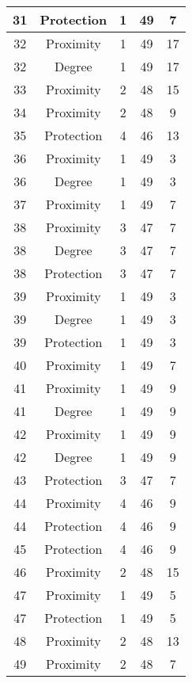 \documentclass[results.tex]{subfiles}
\begin{document}
\begin{center}
\begin{tabular}{| c || c | c | c | c |}
    31 & Protection & 1 & 49 & 7 \\ 
    \hline
    32 & Proximity & 1 & 49 & 17 \\ 
    \hline
    32 & Degree & 1 & 49 & 17 \\ 
    \hline
    33 & Proximity & 2 & 48 & 15 \\ 
    \hline
    34 & Proximity & 2 & 48 & 9 \\ 
    \hline
    35 & Protection & 4 & 46 & 13 \\ 
    \hline
    36 & Proximity & 1 & 49 & 3 \\ 
    \hline
    36 & Degree & 1 & 49 & 3 \\ 
    \hline
    37 & Proximity & 1 & 49 & 7 \\ 
    \hline
    38 & Proximity & 3 & 47 & 7 \\ 
    \hline
    38 & Degree & 3 & 47 & 7 \\ 
    \hline
    38 & Protection & 3 & 47 & 7 \\ 
    \hline
    39 & Proximity & 1 & 49 & 3 \\ 
    \hline
    39 & Degree & 1 & 49 & 3 \\ 
    \hline
    39 & Protection & 1 & 49 & 3 \\ 
    \hline
    40 & Proximity & 1 & 49 & 7 \\ 
    \hline
    41 & Proximity & 1 & 49 & 9 \\ 
    \hline
    41 & Degree & 1 & 49 & 9 \\ 
    \hline
    42 & Proximity & 1 & 49 & 9 \\ 
    \hline
    42 & Degree & 1 & 49 & 9 \\ 
    \hline
    43 & Protection & 3 & 47 & 7 \\ 
    \hline
    44 & Proximity & 4 & 46 & 9 \\ 
    \hline
    44 & Protection & 4 & 46 & 9 \\ 
    \hline
    45 & Protection & 4 & 46 & 9 \\ 
    \hline
    46 & Proximity & 2 & 48 & 15 \\ 
    \hline
    47 & Proximity & 1 & 49 & 5 \\ 
    \hline
    47 & Protection & 1 & 49 & 5 \\ 
    \hline
    48 & Proximity & 2 & 48 & 13 \\ 
    \hline
    49 & Proximity & 2 & 48 & 7 \\ 
    \hline   \end{tabular}
\end{center}
\end{document}
